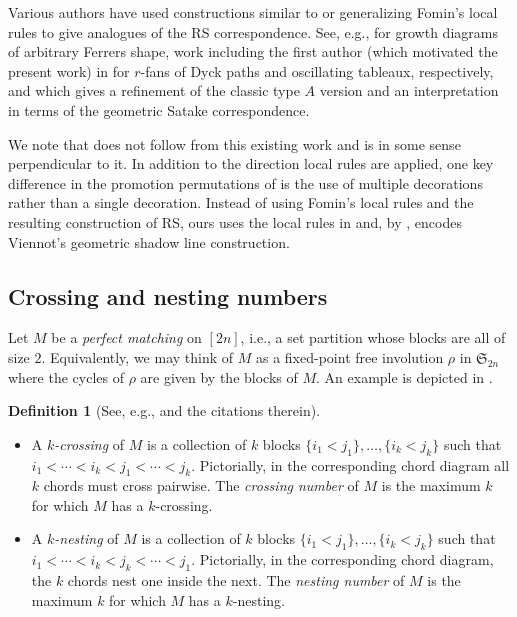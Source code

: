 \documentclass{amsart}
\theoremstyle{definition}
\newtheorem{definition}[theorem]{Definition}
\begin{document}
Various authors have used constructions similar to or generalizing Fomin's local rules to give analogues of the RS correspondence. See, e.g., \cite{Krattenthaler-growth-diagrams} for growth diagrams of arbitrary Ferrers shape, work including the first author (which motivated the present work) in \cite{Papper.Pfannerer.Schilling.Simone,Pfannerer-Rubey-Westbury} for $r$-fans of Dyck paths and oscillating tableaux, respectively, and \cite{Akhmejanov} which gives a refinement of the classic type $A$ version and an interpretation in terms of the geometric Satake correspondence.

We note that  does not follow from this existing work and is in some sense perpendicular to it. In addition to the direction local rules are applied, one key difference in the promotion permutations of \cite{fluctuating-paper} is the use of multiple decorations rather than a single decoration. Instead of using Fomin's local rules and the resulting construction of RS, ours uses the local rules in  and, by , encodes Viennot's geometric shadow line construction.

\subsection{Crossing and nesting numbers}

Let $M$ be a \emph{perfect matching} on $[2n]$, i.e., a set partition whose blocks are all of size $2$. Equivalently, we may think of $M$ as a fixed-point free involution $\rho$ in $\mathfrak{S}_{2n}$ where the cycles of $\rho$ are given by the blocks of $M$. An example is depicted in .

\begin{definition}[{See, e.g., \cite[\S3]{Krattenthaler-growth-diagrams} and the citations therein}]
    \ 
    \begin{itemize}
        \item A \emph{$k$-crossing} of $M$ is a collection of $k$ blocks $\{i_1 < j_1\}, \ldots, \{i_k < j_k\}$ such that $i_1 < \cdots < i_k < j_1 < \cdots < j_k$. Pictorially, in the corresponding chord diagram all $k$ chords must cross pairwise. The \emph{crossing number} of $M$ is the maximum $k$ for which $M$ has a $k$-crossing.
        \item A \emph{$k$-nesting} of $M$ is a collection of $k$ blocks $\{i_1 < j_1\}, \ldots, \{i_k < j_k\}$ such that $i_1 < \cdots < i_k < j_k < \cdots < j_1$. Pictorially, in the corresponding chord diagram, the $k$ chords nest one inside the next. The \emph{nesting number} of $M$ is the maximum $k$ for which $M$ has a $k$-nesting.
    \end{itemize}
\end{definition}
\end{document}
